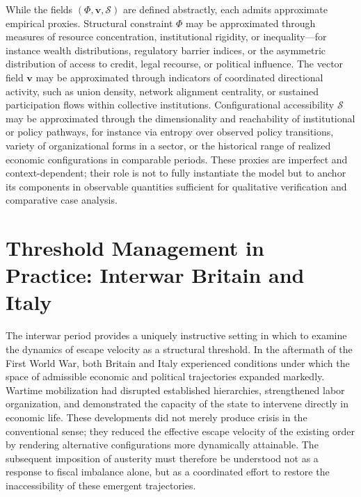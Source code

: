 \documentclass[11pt, a4paper]{article}
\begin{document}
While the fields $(\Phi, \mathbf{v}, \mathcal{S})$ are defined abstractly, each admits approximate empirical proxies. Structural constraint $\Phi$ may be approximated through measures of resource concentration, institutional rigidity, or inequality---for instance wealth distributions, regulatory barrier indices, or the asymmetric distribution of access to credit, legal recourse, or political influence. The vector field $\mathbf{v}$ may be approximated through indicators of coordinated directional activity, such as union density, network alignment centrality, or sustained participation flows within collective institutions. Configurational accessibility $\mathcal{S}$ may be approximated through the dimensionality and reachability of institutional or policy pathways, for instance via entropy over observed policy transitions, variety of organizational forms in a sector, or the historical range of realized economic configurations in comparable periods. These proxies are imperfect and context-dependent; their role is not to fully instantiate the model but to anchor its components in observable quantities sufficient for qualitative verification and comparative case analysis.


\section{Threshold Management in Practice: Interwar Britain and Italy}

The interwar period provides a uniquely instructive setting in which to examine the dynamics of escape velocity as a structural threshold. In the aftermath of the First World War, both Britain and Italy experienced conditions under which the space of admissible economic and political trajectories expanded markedly. Wartime mobilization had disrupted established hierarchies, strengthened labor organization, and demonstrated the capacity of the state to intervene directly in economic life. These developments did not merely produce crisis in the conventional sense; they reduced the effective escape velocity of the existing order by rendering alternative configurations more dynamically attainable. The subsequent imposition of austerity must therefore be understood not as a response to fiscal imbalance alone, but as a coordinated effort to restore the inaccessibility of these emergent trajectories.
\end{document}
